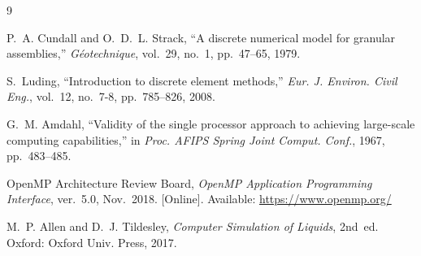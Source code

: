\documentclass[journal]{IEEEtran}
\begin{document}
\begin{thebibliography}{9}

P.~A. Cundall and O.~D.~L. Strack,
``A discrete numerical model for granular assemblies,''
\emph{G\'{e}otechnique}, vol.~29, no.~1, pp.~47--65, 1979.

S.~Luding,
``Introduction to discrete element methods,''
\emph{Eur. J. Environ. Civil Eng.}, vol.~12, no.~7-8,
pp.~785--826, 2008.

G.~M. Amdahl,
``Validity of the single processor approach to achieving large-scale
computing capabilities,''
in \emph{Proc. AFIPS Spring Joint Comput. Conf.}, 1967, pp.~483--485.

OpenMP Architecture Review Board,
\emph{OpenMP Application Programming Interface}, ver.~5.0, Nov.~2018.
[Online]. Available: \url{https://www.openmp.org/}

M.~P. Allen and D.~J. Tildesley,
\emph{Computer Simulation of Liquids}, 2nd~ed.
Oxford: Oxford Univ. Press, 2017.

\end{thebibliography}
\end{document}
